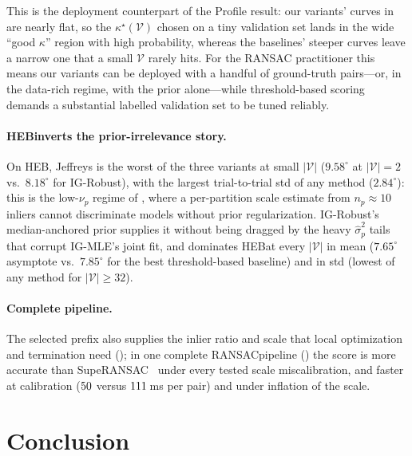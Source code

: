 \documentclass{article}
\newcommand{\mname}[1]{\texorpdfstring{#1\xspace}{#1}}
\newcommand{\ransac}{\mname{RANSAC}}
\newcommand{\superansac}{\mname{SupeRANSAC}}
\newcommand{\igmle}{\mname{IG-MLE}}
\newcommand{\igrobust}{\mname{IG-Robust}}
\newcommand{\heb}{\mname{HEB}}
\begin{document}
This is the deployment counterpart of the Profile result:
our variants' curves in  are nearly flat,
so the $\kappa^\star(\mathcal{V})$ chosen on a tiny validation set
lands in the wide ``good $\kappa$'' region with high probability,
whereas the baselines' steeper curves leave a narrow one that a small
$\mathcal{V}$ rarely hits.  For the \ransac
practitioner this means our variants can be deployed
with a handful of ground-truth pairs---or, in the data-rich
regime, with the prior alone---while threshold-based scoring
demands a substantial labelled validation set to be tuned
reliably.

\paragraph{\heb inverts the prior-irrelevance story.}
On \heb, Jeffreys is the worst of the three variants at
small $|\mathcal{V}|$ ($9.58^\circ$ at $|\mathcal{V}| = 2$ vs.\
$8.18^\circ$ for \igrobust), with the largest trial-to-trial std
of any method ($2.84^\circ$): this is the low-$\nu_p$ regime of
, where a per-partition scale estimate from
$n_p \approx 10$ inliers cannot discriminate models without prior
regularization.  \igrobust's median-anchored prior supplies it
without being dragged by the heavy $\hat\sigma^2_p$ tails that
corrupt \igmle's joint fit, and dominates \heb at every
$|\mathcal{V}|$ in mean ($7.65^\circ$ asymptote vs.\ $7.85^\circ$
for the best threshold-based baseline) and in std (lowest of any
method for $|\mathcal{V}| \ge 32$).

\paragraph{Complete pipeline.}
The selected prefix also supplies the inlier ratio and scale that
local optimization and termination need (\Cref{sec:supp-deploy-lo});
in one complete \ransac pipeline (\Cref{sec:supp-deploy-e2e}) the score is more accurate than
\superansac~\cite{Barath2025superansac} under every tested scale
miscalibration, and faster at calibration ($50$ versus
$111$\,ms per pair) and under inflation of the scale.

\section{Conclusion}
\label{sec:conclusion}
\end{document}
